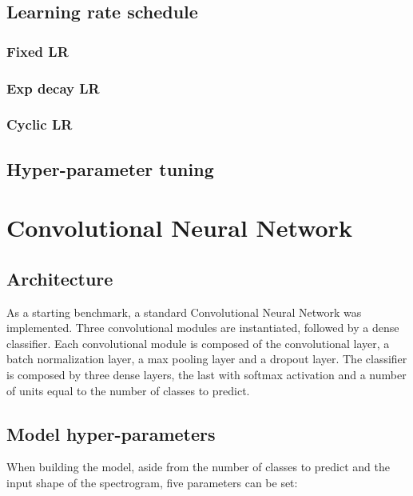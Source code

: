 \subsection{Learning rate schedule}

\subsubsection{Fixed LR}
\subsubsection{Exp decay LR}
\subsubsection{Cyclic LR}

\subsection{Hyper-parameter tuning}

\section{Convolutional Neural Network}
\label{sec:convolutional_arch}

\subsection{Architecture}

As a starting benchmark, a standard Convolutional Neural Network was implemented.
Three convolutional modules are instantiated, followed by a dense classifier.
Each convolutional module is composed of the convolutional layer, a batch
normalization layer, a max pooling layer and a dropout layer.
The classifier is composed by three dense layers, the last with softmax
activation and a number of units equal to the number of classes to predict.

\subsection{Model hyper-parameters}

When building the model, aside from the number of classes to predict and the
input shape of the spectrogram, five parameters can be set:

